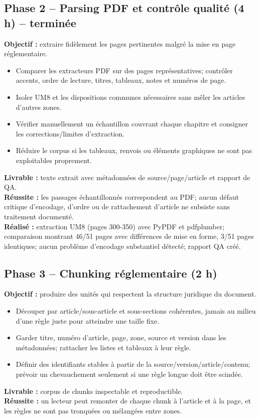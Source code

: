 \documentclass[11pt,a4paper]{article}
\begin{document}
\subsection*{Phase 2 -- Parsing PDF et contrôle qualité (4 h) -- terminée}
\textbf{Objectif :} extraire fidèlement les pages pertinentes malgré la mise en page réglementaire.
\begin{itemize}
  \item Comparer les extracteurs PDF sur des pages représentatives; contrôler accents, ordre de lecture, titres, tableaux, notes et numéros de page.
  \item Isoler UM8 et les dispositions communes nécessaires sans mêler les articles d'autres zones.
  \item Vérifier manuellement un échantillon couvrant chaque chapitre et consigner les corrections/limites d'extraction.
  \item Réduire le corpus si les tableaux, renvois ou éléments graphiques ne sont pas exploitables proprement.
\end{itemize}
\textbf{Livrable :} texte extrait avec métadonnées de source/page/article et rapport de QA.\\
\textbf{Réussite :} les passages échantillonnés correspondent au PDF; aucun défaut critique d'encodage, d'ordre ou de rattachement d'article ne subsiste sans traitement documenté.\\
\textbf{Réalisé :} extraction UM8 (pages 300-350) avec PyPDF et pdfplumber; comparaison montrant 46/51 pages avec différences de mise en forme, 3/51 pages identiques; aucun problème d'encodage substantiel détecté; rapport QA créé.

\subsection*{Phase 3 -- Chunking réglementaire (2 h)}
\textbf{Objectif :} produire des unités qui respectent la structure juridique du document.
\begin{itemize}
  \item Découper par article/sous-article et sous-sections cohérentes, jamais au milieu d'une règle juste pour atteindre une taille fixe.
  \item Garder titre, numéro d'article, page, zone, source et version dans les métadonnées; rattacher les listes et tableaux à leur règle.
  \item Définir des identifiants stables à partir de la source/version/article/contenu; prévoir un chevauchement seulement si une règle longue doit être scindée.
\end{itemize}
\textbf{Livrable :} corpus de chunks inspectable et reproductible.\\
\textbf{Réussite :} un lecteur peut remonter de chaque chunk à l'article et à la page, et les règles ne sont pas tronquées ou mélangées entre zones.
\end{document}
